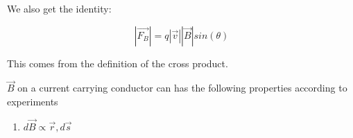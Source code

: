 \documentclass{report}
\begin{document}
\begin{description}
\begin{mdframed}
           We also get the identity:

           \begin{displaymath}
            |\vec{F_B}| = q |\vec{v}| |\vec{B}| sin(\theta)
           \end{displaymath}

           This comes from the definition of the cross product.
           
           $\vec{B}$ on a current carrying conductor can
           has the following properties according to
           experiments

           \begin{enumerate}
               \item $d\vec{B} \propto \vec{r}, d\vec{s}$
           \end{enumerate}

           
        \end{mdframed}
\end{description}
\end{document}
